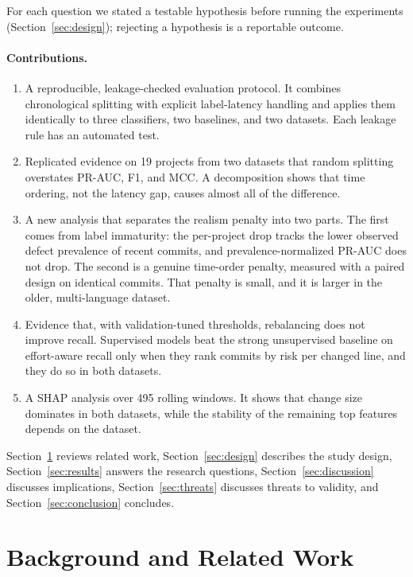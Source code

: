 For each question we stated a testable hypothesis before running the experiments (Section~\ref{sec:design}); rejecting a hypothesis is a reportable outcome.

\paragraph{Contributions.}
\begin{enumerate}
\item A reproducible, leakage-checked evaluation protocol. It combines chronological splitting with explicit label-latency handling and applies them identically to three classifiers, two baselines, and two datasets. Each leakage rule has an automated test.
\item Replicated evidence on 19 projects from two datasets that random splitting overstates PR-AUC, F1, and MCC. A decomposition shows that time ordering, not the latency gap, causes almost all of the difference.
\item A new analysis that separates the realism penalty into two parts. The first comes from label immaturity: the per-project drop tracks the lower observed defect prevalence of recent commits, and prevalence-normalized PR-AUC does not drop. The second is a genuine time-order penalty, measured with a paired design on identical commits. That penalty is small, and it is larger in the older, multi-language dataset.
\item Evidence that, with validation-tuned thresholds, rebalancing does not improve recall. Supervised models beat the strong unsupervised baseline on effort-aware recall only when they rank commits by risk per changed line, and they do so in both datasets.
\item A SHAP analysis over 495 rolling windows. It shows that change size dominates in both datasets, while the stability of the remaining top features depends on the dataset.
\end{enumerate}

Section~\ref{sec:related} reviews related work, Section~\ref{sec:design} describes the study design, Section~\ref{sec:results} answers the research questions, Section~\ref{sec:discussion} discusses implications, Section~\ref{sec:threats} discusses threats to validity, and Section~\ref{sec:conclusion} concludes.

\section{Background and Related Work}\label{sec:related}

